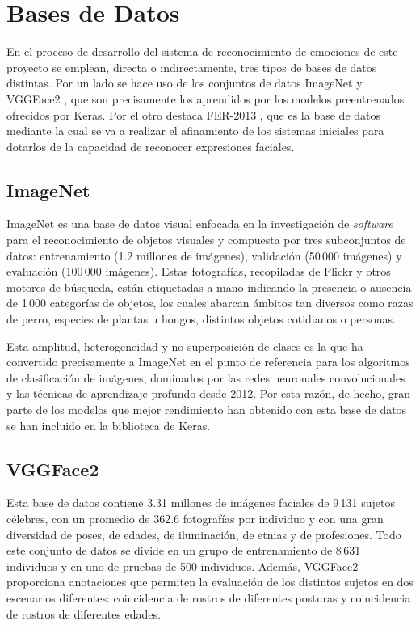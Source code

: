 \section{Bases de Datos}

En el proceso de desarrollo del sistema de reconocimiento de emociones de este proyecto se emplean, directa o indirectamente, tres tipos de bases de datos distintas. Por un lado se hace uso de los conjuntos de datos ImageNet \cite{ImageNet} y VGGFace2 \cite{VGGFace2}, que son precisamente los aprendidos por los modelos preentrenados ofrecidos por Keras. Por el otro destaca FER-2013 \cite{FER-2013}, que es la base de datos mediante la cual se va a realizar el afinamiento de los sistemas iniciales para dotarlos de la capacidad de reconocer expresiones faciales.

\subsection{ImageNet} \label{Chapter:ImageNet}

ImageNet es una base de datos visual enfocada en la investigación de \textit{software} para el reconocimiento de objetos visuales y compuesta por tres subconjuntos de datos: entrenamiento (1.2 millones de imágenes), validación (50\,000 imágenes) y evaluación (100\,000 imágenes). Estas fotografías, recopiladas de Flickr y otros motores de búsqueda, están etiquetadas a mano indicando la presencia o ausencia de 1\,000 categorías de objetos, los cuales abarcan ámbitos tan diversos como razas de perro, especies de plantas u hongos, distintos objetos cotidianos o personas.

Esta amplitud, heterogeneidad y no superposición de clases es la que ha convertido precisamente a ImageNet en el punto de referencia para los algoritmos de clasificación de imágenes, dominados por las redes neuronales convolucionales y las técnicas de aprendizaje profundo desde 2012. Por esta razón, de hecho, gran parte de los modelos que mejor rendimiento han obtenido con esta base de datos se han incluido en la biblioteca de Keras.

\subsection{VGGFace2} \label{Chapter:VGGFace2}

Esta base de datos contiene 3.31 millones de imágenes faciales de 9\,131 sujetos célebres, con un promedio de 362.6 fotografías por individuo y con una gran diversidad de poses, de edades, de iluminación, de etnias y de profesiones. Todo este conjunto de datos se divide en un grupo de entrenamiento de 8\,631 individuos y en uno de pruebas de 500 individuos. Además, VGGFace2 proporciona anotaciones que permiten la evaluación de los distintos sujetos en dos escenarios diferentes: coincidencia de rostros de diferentes posturas y coincidencia de rostros de diferentes edades.

